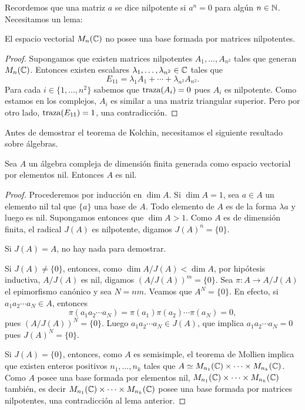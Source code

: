 Recordemos que una matriz $a$ se dice nilpotente si $a^n=0$ para algún $n\in\mathbb{N}$. 
Necesitamos un lema:

\begin{lemma}
	\label{lem:base_de_nilpotentes}
	El espacio vectorial $M_n(\mathbb{C})$ no posee una base formada por matrices
	nilpotentes.
\end{lemma}

\begin{proof}
	Supongamos que existen matrices nilpotentes $A_1,\dots,A_{n^2}$ tales que
	generan $M_n(\mathbb{C})$. Entonces existen escalares
	$\lambda_1,\dots,\lambda_{n^2}\in \mathbb{C}$ tales que
	\[
		E_{11}=\lambda_1A_1+\cdots+\lambda_{n^2}A_{n^2}.
	\]
	Para cada $i\in\{1,\dots,n^2\}$ sabemos que $\operatorname{traza}(A_i)=0$ pues $A_i$ es
	nilpotente. Como estamos en los complejos, $A_i$ es similar a una
	matriz triangular superior. Pero por otro lado, $\operatorname{traza}(E_{11})=1$, una
	contradicción.
\end{proof}

Antes de demostrar el teorema de Kolchin, 
necesitamos el siguiente resultado sobre álgebras.  

\begin{theorem}[Wedderburn]
	Sea $A$ un álgebra compleja de dimensión finita generada como espacio vectorial por
	elementos nil. Entonces $A$ es nil.
\end{theorem}

\begin{proof}
	Procederemos por inducción en $\dim A$. Si $\dim A=1$, sea $a\in A$ un
	elemento nil tal que $\{a\}$ una base de $A$. Todo elemento de $A$ es de la
	forma $\lambda a$ y luego es nil.  Supongamos entonces que $\dim A>1$. Como
	$A$ es de dimensión finita, el radical
	$J(A)$ es nilpotente, digamos $J(A)^n=\{0\}$. 
	
	Si $J(A)=A$, no hay nada para
	demostrar. 
	
	Si $J(A)\ne\{0\}$, entonces, como $\dim A/J(A)<\dim A$, por
	hipótesis inductiva, $A/J(A)$ es nil, digamos $(A/J(A))^m=\{0\}$. 
	Sea $\pi\colon A\to A/J(A)$ el epimorfismo 
	canónico y sea $N=nm$. Veamos que $A^N=\{0\}$. En efecto, 
	si $a_1a_2\cdots a_N\in A$, entonces 
	\[
	\pi(a_1a_2\cdots a_N)=\pi(a_1)\pi(a_2)\cdots \pi(a_N)=0,
	\]
	pues $(A/J(A))^N=\{0\}$. Luego
	$a_1a_2\cdots a_N\in J(A)$, que implica $a_1a_2\cdots a_N=0$ pues
	$J(A)^N=\{0\}$.  
	
	Si $J(A)=\{0\}$, entonces, como $A$ es semisimple, 
	el teorema de Mollien implica
	que existen enteros positivos $n_1,\dots,n_k$ tales que $A\simeq
	M_{n_1}(\mathbb{C})\times\cdots\times M_{n_k}(\mathbb{C})$. Como $A$ posee una base formada
	por elementos nil, $M_{n_1}(\mathbb{C})\times\cdots\times M_{n_k}(\mathbb{C})$
	también, 
	es decir $M_{n_1}(\mathbb{C})\times\cdots\times M_{n_k}(\mathbb{C})$ posee una base formada por matrices nilpotentes, 
	una contradicción al lema anterior.
%	
\end{proof}

